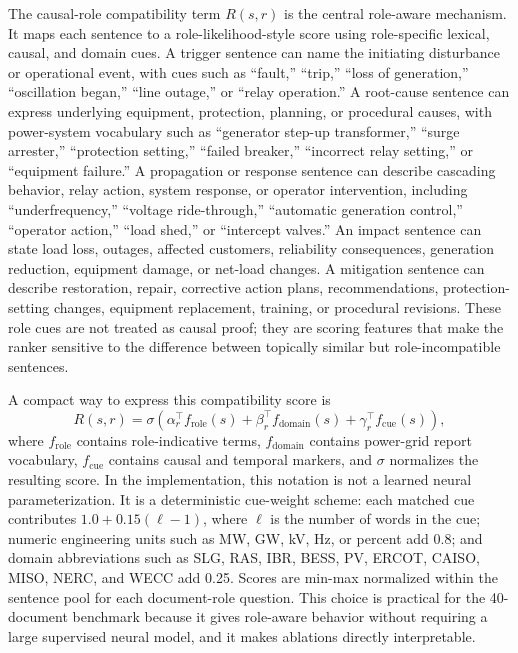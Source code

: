 \documentclass{ieeeaccess}
\begin{document}
The causal-role compatibility term \(R(s,r)\) is the central role-aware mechanism. It maps each sentence to a role-likelihood-style score using role-specific lexical, causal, and domain cues. A trigger sentence can name the initiating disturbance or operational event, with cues such as ``fault,'' ``trip,'' ``loss of generation,'' ``oscillation began,'' ``line outage,'' or ``relay operation.'' A root-cause sentence can express underlying equipment, protection, planning, or procedural causes, with power-system vocabulary such as ``generator step-up transformer,'' ``surge arrester,'' ``protection setting,'' ``failed breaker,'' ``incorrect relay setting,'' or ``equipment failure.'' A propagation or response sentence can describe cascading behavior, relay action, system response, or operator intervention, including ``underfrequency,'' ``voltage ride-through,'' ``automatic generation control,'' ``operator action,'' ``load shed,'' or ``intercept valves.'' An impact sentence can state load loss, outages, affected customers, reliability consequences, generation reduction, equipment damage, or net-load changes. A mitigation sentence can describe restoration, repair, corrective action plans, recommendations, protection-setting changes, equipment replacement, training, or procedural revisions. These role cues are not treated as causal proof; they are scoring features that make the ranker sensitive to the difference between topically similar but role-incompatible sentences.

A compact way to express this compatibility score is
\[
R(s,r)=
\sigma\left(
\alpha_r^\top f_{\mathrm{role}}(s)
+
\beta_r^\top f_{\mathrm{domain}}(s)
+
\gamma_r^\top f_{\mathrm{cue}}(s)
\right),
\]
where \(f_{\mathrm{role}}\) contains role-indicative terms, \(f_{\mathrm{domain}}\) contains power-grid report vocabulary, \(f_{\mathrm{cue}}\) contains causal and temporal markers, and \(\sigma\) normalizes the resulting score. In the implementation, this notation is not a learned neural parameterization. It is a deterministic cue-weight scheme: each matched cue contributes \(1.0+0.15(\ell-1)\), where \(\ell\) is the number of words in the cue; numeric engineering units such as MW, GW, kV, Hz, or percent add 0.8; and domain abbreviations such as SLG, RAS, IBR, BESS, PV, ERCOT, CAISO, MISO, NERC, and WECC add 0.25. Scores are min-max normalized within the sentence pool for each document-role question. This choice is practical for the 40-document benchmark because it gives role-aware behavior without requiring a large supervised neural model, and it makes ablations directly interpretable.
\end{document}
